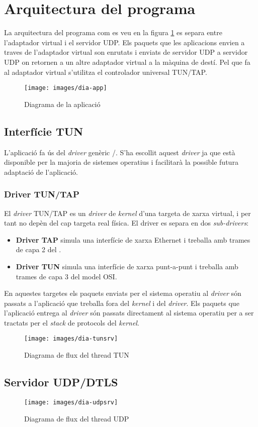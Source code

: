 \clearpage%
\section{Arquitectura del programa}
La arquitectura del programa com es veu en la figura \ref{F:dia-app} es separa entre l'adaptador virtual i el servidor UDP. Els paquets que les aplicacions envien a traves de l'adaptador virtual son enrutats i enviats de servidor UDP a servidor UDP on retornen a un altre adaptador virtual a la màquina de destí.
Pel que fa al adaptador virtual s'utilitza el controlador universal TUN/TAP.
\begin{figure}[htb]
\centering
\texttt{[image: images/dia-app]}
\caption{Diagrama de la aplicació}
\label{F:dia-app}
\end{figure}
\clearpage%
\subsection{Interfície TUN}
L'aplicació fa ús del \emph{driver} genèric /. S'ha escollit aquest \emph{driver} ja que està disponible per la majoria de sistemes operatius i facilitarà la possible futura adaptació de l'aplicació.

\subsubsection{Driver TUN/TAP}
El \emph{driver} TUN/TAP es un \emph{driver} de \emph{kernel} d'una targeta de xarxa virtual, i per tant no depèn del cap targeta real física. El driver es separa en dos \emph{sub-drivers}:
\begin{itemize}
\item \textbf{Driver TAP} simula una interfície de xarxa Ethernet i treballa amb trames de capa 2 del .
\item \textbf{Driver TUN} simula una interfície de xarxa punt-a-punt i treballa amb trames de capa 3 del model OSI.
\end{itemize}

En aquestes targetes els paquets enviats per el sistema operatiu al \emph{driver} són passats a l'aplicació que treballa fora del \emph{kernel} i del \emph{driver}. Els paquets que l'aplicació entrega al \emph{driver} són passats directament al sistema operatiu per a ser tractats per el \emph{stack} de protocols del \emph{kernel}.

\begin{figure}[htb]
\centering
\texttt{[image: images/dia-tunsrv]}
\caption{Diagrama de flux del thread TUN}
\label{F:dia-tunsrv}
\end{figure}
\clearpage%
\subsection{Servidor UDP/DTLS}
\begin{figure}[htb]
\centering
\texttt{[image: images/dia-udpsrv]}
\caption{Diagrama de flux del thread UDP}
\label{F:dia-udpsrv}
\end{figure}
